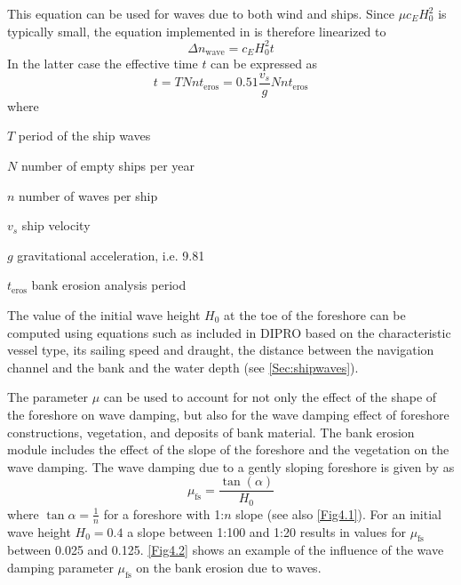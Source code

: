 %
This equation can be used for waves due to both wind and ships.
Since $\mu c_E H_0^2$ is typically small, the equation implemented in \dfastbe is therefore linearized to
%
\begin{equation}
\Delta n_\text{wave} = c_E H_0^2 t
\end{equation}
%
In the latter case the effective time $t$ can be expressed as
%
\begin{equation}
t = T N n t_\text{eros} = 0.51 \frac{v_s}{g} N n t_\text{eros}
\end{equation}
%
where
%
\begin{symbollist}
\item[$T$] period of the ship waves 
\item[$N$] number of empty ships per year 
\item[$n$] number of waves per ship \unitbrackets{-}
\item[$v_s$] ship velocity 
\item[$g$] gravitational acceleration, i.e. 9.81 
\item[$t_\text{eros}$] bank erosion analysis period 
\end{symbollist}
%
The value of the initial wave height $H_0$ at the toe of the foreshore can be computed using equations such as included in DIPRO based on the characteristic vessel type, its sailing speed and draught, the distance between the navigation channel and the bank and the water depth (see \autoref{Sec:shipwaves}).

The parameter $\mu$ can be used to account for not only the effect of the shape of the foreshore on wave damping, but also for the wave damping effect of foreshore constructions, vegetation, and deposits of bank material.
The bank erosion module includes the effect of the slope of the foreshore and the vegetation on the wave damping.
The wave damping due to a gently sloping foreshore is given by \citet{Verheij00} as
%
\begin{equation}
\mu_\text{fs} = \frac{\tan(\alpha)}{H_0}
\end{equation}
%
where $\tan \alpha = \frac{1}{n}$ for a foreshore with 1:$n$ slope (see also \autoref{Fig4.1}).
For an initial wave height $H_0 = 0.4$ a slope between 1:100 and 1:20 results in values for $\mu_\text{fs}$ between 0.025 and 0.125.
\autoref{Fig4.2} shows an example of the influence of the wave damping parameter $\mu_\text{fs}$ on the bank erosion due to waves.

